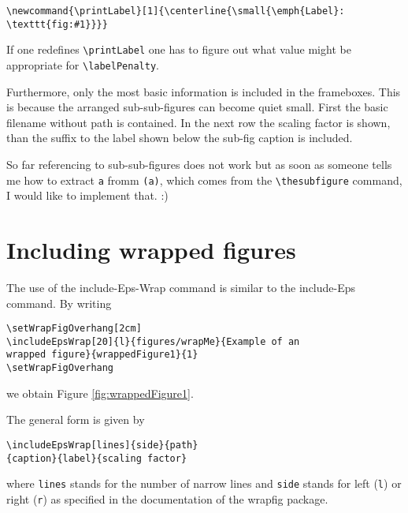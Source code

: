 \documentclass[12pt,a4paper]{article}
\newcommand{\comm}[1]{\texttt{#1}}
\begin{document}
\begin{verbatim}
\newcommand{\printLabel}[1]{\centerline{\small{\emph{Label}: \texttt{fig:#1}}}}
\end{verbatim}

If one redefines \verb+\printLabel+ one has to figure out what value might be appropriate
for \verb+\labelPenalty+.

Furthermore, only the most basic information is included in the frameboxes. This is 
because the arranged sub-sub-figures can become quiet small. First the basic filename 
without path is contained. In the next row the scaling factor is shown, than the suffix 
to the label shown below the sub-fig caption is included.

So far referencing to sub-sub-figures does not work but as soon as someone tells me how 
to extract \comm{a} fromm \comm{(a)}, which comes from the \verb+\thesubfigure+ command, I 
would like to implement that. :)


\clearpage








\section{Including wrapped figures}


The use of the include-Eps-Wrap command is similar to the 
include-Eps command. By writing

\setWrapFigOverhang[2cm]
\setWrapFigOverhang

\begin{verbatim} 
\setWrapFigOverhang[2cm]
\includeEpsWrap[20]{l}{figures/wrapMe}{Example of an 
wrapped figure}{wrappedFigure1}{1} 
\setWrapFigOverhang
\end{verbatim}

we obtain Figure \ref{fig:wrappedFigure1}.

The general form is given by

\begin{verbatim} 
\includeEpsWrap[lines]{side}{path}
{caption}{label}{scaling factor} 
\end{verbatim}

where \comm{lines} stands for the number of narrow lines and \comm{side} stands 
for left (\comm{l}) or right (\comm{r}) as specified in the documentation of the 
wrapfig package.
\end{document}
